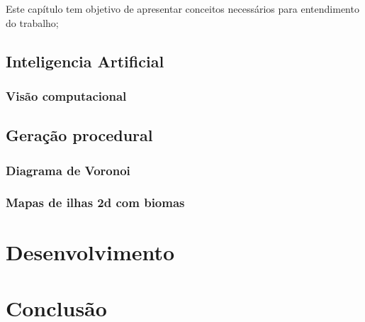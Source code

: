 \documentclass[
	12pt,				%
	openright,			%
	twoside,			%
	a4paper,			%
	english,			%
	french,				%
	spanish,			%
	brazil				%
	]{abntex2}
\begin{document}
Este capítulo tem objetivo de apresentar conceitos necessários para entendimento do trabalho;

\section{Inteligencia Artificial}

\subsection{Visão computacional}

\section{Geração procedural}
\subsection{Diagrama de Voronoi}

\subsection{Mapas de ilhas 2d com biomas}

\chapter{Desenvolvimento}


\chapter*[Conclusão]{Conclusão}

\lipsum[31-33]

\postextual


\end{document}
